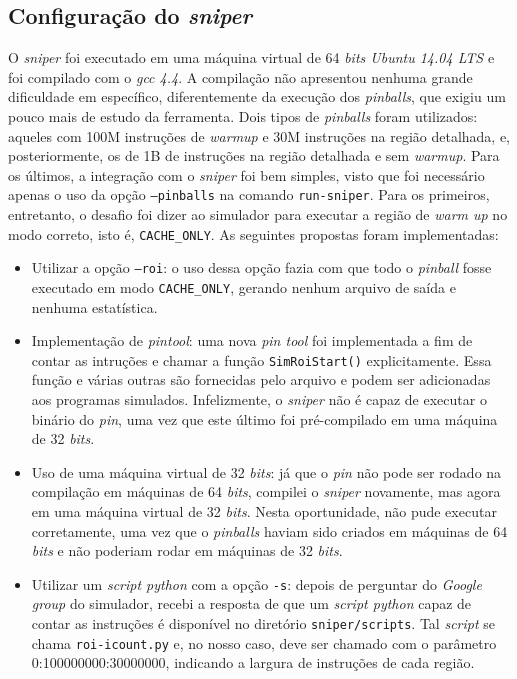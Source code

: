 \documentclass[12pt]{article}
\begin{document}
\subsection{Configuração do \textit{sniper}}

O \textit{sniper} foi executado em uma máquina virtual de 64 \textit{bits
Ubuntu 14.04 LTS} e foi compilado com o \textit{gcc 4.4}. A compilação não
apresentou nenhuma grande dificuldade em específico, diferentemente da execução
dos \textit{pinballs}, que exigiu um pouco mais de estudo da ferramenta. Dois
tipos de \textit{pinballs} foram utilizados: aqueles com 100M instruções de
\textit{warmup} e 30M instruções na região detalhada, e, posteriormente, os de
1B de instruções na região detalhada e sem \textit{warmup}. Para os últimos, a
integração com o \textit{sniper} foi bem simples, visto que foi necessário
apenas o uso da opção \texttt{--pinballs} na comando \texttt{run-sniper}. Para
os primeiros, entretanto, o desafio foi dizer ao simulador para executar a
região de \textit{warm up} no modo correto, isto é, \texttt{CACHE\_ONLY}. As
seguintes propostas foram implementadas:

\begin {itemize}
	\item Utilizar a opção \texttt{--roi}: o uso dessa opção fazia com que todo o
	\textit{pinball} fosse executado em modo \texttt{CACHE\_ONLY}, gerando nenhum
	arquivo de saída e nenhuma estatística.
	\item Implementação de \textit{pintool}: uma nova \textit{pin tool} foi
	implementada a fim de contar as intruções e chamar a função
	\texttt{SimRoiStart()} explicitamente. Essa função e várias outras são
	fornecidas pelo arquivo  e podem ser adicionadas
	aos programas simulados. Infelizmente, o \textit{sniper} não é capaz de
	executar o binário do \textit{pin}, uma vez que este último foi pré-compilado
	em uma máquina de 32 \textit{bits}.
	\item Uso de uma máquina virtual de 32 \textit{bits}: já que o \textit{pin} não
	pode ser rodado na compilação em máquinas de 64 \textit{bits}, compilei o
	\textit{sniper} novamente, mas agora em uma máquina virtual de 32
	\textit{bits}. Nesta oportunidade, não pude executar corretamente, uma vez que
	o \textit{pinballs} haviam sido criados em máquinas de 64 \textit{bits} e não
	poderiam rodar em máquinas de 32 \textit{bits}.
	\item Utilizar um \textit{script python} com a opção \texttt{-s}: depois de
	perguntar do \textit{Google group} do simulador, recebi a resposta de que um
	\textit{script python} capaz de contar as instruções é disponível no diretório
	\texttt{sniper/scripts}. Tal \textit{script} se chama \texttt{roi-icount.py} e,
	no nosso caso, deve ser chamado com o parâmetro 0:100000000:30000000, indicando
	a largura de instruções de cada região.
\end{itemize}
\end{document}
